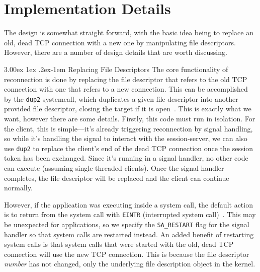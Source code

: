 \documentclass[twocolumn,11pt]{article}
\makeatletter
\renewcommand{\paragraph}{%
  \@startsection{paragraph}{4}%
  {\z@}{3.00ex \@plus 1ex \@minus .2ex}{-1em}%
  {\normalfont\normalsize\bfseries}%
}
\makeatother
\begin{document}
\section{Implementation Details}
\label{sec:impl}

The design is somewhat straight forward, with the basic idea being to replace an
old, dead TCP connection with a new one by manipulating file descriptors.
However, there are a number of design details that are worth discussing.

\paragraph{Replacing File Descriptors}
The core functionality of reconnection is done by replacing the file descriptor
that refers to the old TCP connection with one that refers to a new connection.
This can be accomplished by the \texttt{dup2} systemcall, which duplicates a
given file descriptor into another provided file descriptor, closing the target
if it is open~\cite{dup}. This is exactly what we want, however there are some details.
Firstly, this code must run in isolation. For the client, this is simple---it's
already triggering reconnection by signal handling, so while it's handling
the signal to interact with the session-server, we can also use \texttt{dup2} to
replace the client's end of the dead TCP connection once the session token has been
exchanged. Since it's running in a signal handler, no other code can execute
(assuming single-threaded clients). Once the signal handler completes, the file
descriptor will be replaced and the client can continue normally.

However, if the application was executing inside a system call, the default
action is to return from the system call with \texttt{EINTR} (interrupted system
call)~\cite{sigaction}. This may be unexpected for applications, so we specify the
\texttt{SA\_RESTART} flag for the signal handler so that system calls are
restarted instead. An added benefit of restarting system calls is that system
calls that were started with the old, dead TCP connection will use the new TCP
connection. This is because the file descriptor \textit{number} has not changed,
only the underlying file description object in the kernel.
\end{document}
